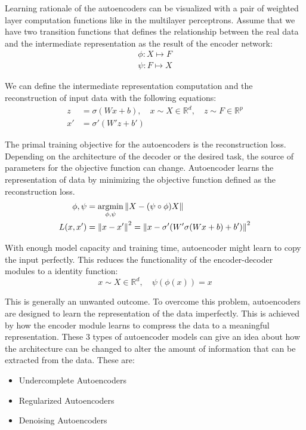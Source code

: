 Learning rationale of the autoencoders can be visualized with a pair of weighted layer computation
functions like in the multilayer perceptrons. Assume that we have two transition functions that
defines the relationship between the real data and the intermediate representation as the result of
the encoder network:
\begin{align*}
    \phi : X \mapsto F \\
    \psi : F \mapsto X     
\end{align*}

We can define the intermediate representation computation and the reconstruction of input data
with the following equations:
\begin{align}  
    z  &= \sigma( W x + b) ,\quad x \sim X \in \mathbb{R}^d ,\quad z \sim F \in \mathbb{R}^p \\
    x'  &= \sigma' (W' z + b') 
\end{align}

The primal training objective for the autoencoders is the reconstruction loss. Depending on the
architecture of the decoder or the desired task, the source of parameters for the objective
function can change. Autoencoder learns the representation of data by minimizing the objective function 
defined as the reconstruction loss. 
\begin{align}
    \label{eqn:ae_rec}
  \phi, \psi & = \underset{\phi, \psi}{\text{argmin}} \left\lVert X - (\psi \circ \phi) X\right\rVert \\  
  L(x, x') & = \left\lVert x - x'\right\rVert^2 = \left\lVert x - \sigma' (W' \sigma (W x + b) + b')\right\rVert^2
\end{align}

With enough model capacity and training time, autoencoder might learn to copy the input perfectly.
This reduces the functionality of the encoder-decoder modules to a identity function:
$$
 x \sim X \in \mathbb{R}^d, \quad \psi(\phi(x)) = x
$$

This is generally an unwanted outcome. To overcome this problem, autoencoders are designed to learn the
representation of the data imperfectly. \cite{Goodfellow-et-al-2016} This is achieved by how the
encoder module learns to compress the data to a meaningful representation. These 3 types of
autoencoder models can give an idea about how the architecture can be changed to alter the amount of
information that can be extracted from the data. These are:

\begin{itemize}
    \item Undercomplete Autoencoders
    \item Regularized Autoencoders
    \item Denoising Autoencoders
\end{itemize}

